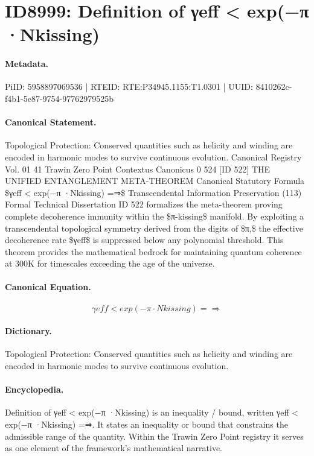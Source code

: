 \section*{ID8999: Definition of γeff < exp(−π ·Nkissing)}
\paragraph{Metadata.}
PiID: 5958897069536 | RTEID: RTE:P34945.1155:T1.0301 | UUID: 8410262c-f4b1-5e87-9754-97762979525b

\paragraph{Canonical Statement.}
Topological Protection: Conserved quantities such as helicity and winding are encoded in harmonic modes to survive continuous evolution. Canonical Registry Vol. 01 41 Trawin Zero Point Contextus Canonicus 0 524 [ID 522] THE UNIFIED ENTANGLEMENT META-THEOREM Canonical Statutory Formula \$γeff < exp(−π ·Nkissing) =⇒\$ Transcendental Information Preservation (113) Formal Technical Dissertation ID 522 formalizes the meta-theorem proving complete decoherence immunity within the \$π-kissing\$ manifold. By exploiting a transcendental topological symmetry derived from the digits of \$π,\$ the effective decoherence rate \$γeff\$ is suppressed below any polynomial threshold. This theorem provides the mathematical bedrock for maintaining quantum coherence at 300K for timescales exceeding the age of the universe.

\paragraph{Canonical Equation.}
\[
γeff < exp(−π ·Nkissing) =⇒
\]

\paragraph{Dictionary.}
Topological Protection: Conserved quantities such as helicity and winding are encoded in harmonic modes to survive continuous evolution.

\paragraph{Encyclopedia.}
Definition of γeff < exp(−π ·Nkissing) is an inequality / bound, written γeff < exp(−π ·Nkissing) =⇒. It states an inequality or bound that constrains the admissible range of the quantity. Within the Trawin Zero Point registry it serves as one element of the framework's mathematical narrative.
